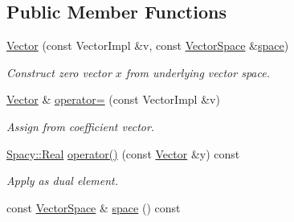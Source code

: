 \subsection*{Public Member Functions}
\begin{DoxyCompactItemize}
\item 
\hyperlink{classSpacy_1_1Generic_1_1Vector_a35622c4a7a184c2d6ff951bbde6a871c}{Vector} (const Vector\-Impl \&v, const \hyperlink{classSpacy_1_1VectorSpace}{Vector\-Space} \&\hyperlink{classSpacy_1_1VectorBase_aa999dbf9d679d895dfe04c10fbf9f5e9}{space})
\begin{DoxyCompactList}\small\item\em Construct zero vector $x$ from underlying vector space. \end{DoxyCompactList}\item 
\hyperlink{classSpacy_1_1Generic_1_1Vector}{Vector} \& \hyperlink{classSpacy_1_1Generic_1_1Vector_acec9492900de215a4e3d4b16129fbadd}{operator=} (const Vector\-Impl \&v)
\begin{DoxyCompactList}\small\item\em Assign from coefficient vector. \end{DoxyCompactList}\item 
\hyperlink{classSpacy_1_1Real}{Spacy\-::\-Real} \hyperlink{classSpacy_1_1Generic_1_1Vector_acf676aac17118e0b3b7d6b08f026d641}{operator()} (const \hyperlink{classSpacy_1_1Generic_1_1Vector}{Vector} \&y) const 
\begin{DoxyCompactList}\small\item\em Apply as dual element. \end{DoxyCompactList}\item 
\hypertarget{classSpacy_1_1VectorBase_aa999dbf9d679d895dfe04c10fbf9f5e9}{const \hyperlink{classSpacy_1_1VectorSpace}{Vector\-Space} \& \hyperlink{classSpacy_1_1VectorBase_aa999dbf9d679d895dfe04c10fbf9f5e9}{space} () const }\label{classSpacy_1_1VectorBase_aa999dbf9d679d895dfe04c10fbf9f5e9}


\end{DoxyCompactItemize}
